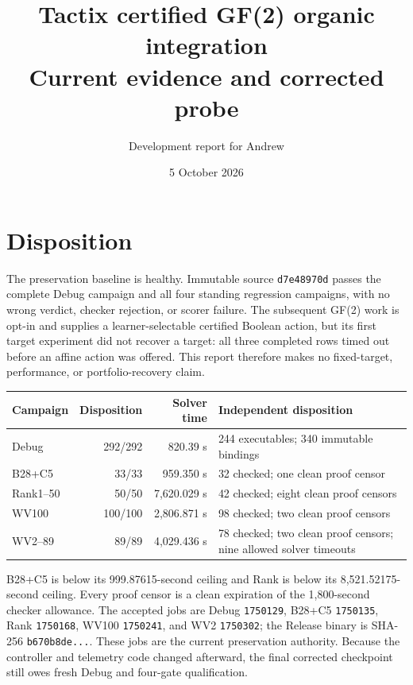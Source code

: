 \documentclass[11pt]{article}
\title{Tactix certified GF(2) organic integration\\Current evidence and corrected probe}
\author{Development report for Andrew}
\date{5 October 2026}
\newcommand{\code}[1]{\texttt{#1}}
\begin{document}
\maketitle

\section*{Disposition}

The preservation baseline is healthy.  Immutable source \code{d7e48970d}
passes the complete Debug campaign and all four standing regression campaigns,
with no wrong verdict, checker rejection, or scorer failure.  The subsequent
GF(2) work is opt-in and supplies a learner-selectable certified Boolean action,
but its first target experiment did not recover a target: all three completed
rows timed out before an affine action was offered.  This report therefore
makes no fixed-target, performance, or portfolio-recovery claim.

\begin{center}
\small
\begin{tabularx}{\textwidth}{@{}lrrX@{}}
\toprule
Campaign & Disposition & Solver time & Independent disposition \\
\midrule
Debug & 292/292 & 820.39 s & 244 executables; 340 immutable bindings \\
B28+C5 & 33/33 & 959.350 s & 32 checked; one clean proof censor \\
Rank1--50 & 50/50 & 7,620.029 s & 42 checked; eight clean proof censors \\
WV100 & 100/100 & 2,806.871 s & 98 checked; two clean proof censors \\
WV2--89 & 89/89 & 4,029.436 s & 78 checked; two clean proof censors; nine allowed solver timeouts \\
\bottomrule
\end{tabularx}
\end{center}

B28+C5 is below its 999.87615-second ceiling and Rank is below its
8,521.52175-second ceiling.  Every proof censor is a clean expiration of the
1,800-second checker allowance.  The accepted jobs are Debug \code{1750129},
B28+C5 \code{1750135}, Rank \code{1750168}, WV100 \code{1750241}, and WV2
\code{1750302}; the Release binary is SHA-256 \code{b670b8de...}.  These jobs
are the current preservation authority.  Because the controller and telemetry
code changed afterward, the final corrected checkpoint still owes fresh Debug
and four-gate qualification.
\end{document}
